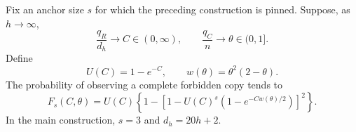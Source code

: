 \begin{theorem}
\label{thm:rectangle-limit}
Fix an anchor size \(s\) for which the preceding construction is pinned.
Suppose, as \(h\to\infty\),
\[
 \frac{q_R}{d_h}\longrightarrow C\in(0,\infty),\qquad
 \frac{q_C}{n}\longrightarrow\theta\in(0,1].
\]
Define
\begin{equation}
 U(C)=1-e^{-C},\qquad w(\theta)=\theta^2(2-\theta).
 \label{eq:rectangle-parameters}
\end{equation}
The probability of observing a complete forbidden copy tends to
\begin{equation}
 F_s(C,\theta)=U(C)
 \left\{1-\left[1-U(C)^s
       \left(1-e^{-Cw(\theta)/2}\right)\right]^2\right\}.
 \label{eq:rectangle-limit}
\end{equation}
In the main construction, \(s=3\) and \(d_h=20h+2\).
\end{theorem}
